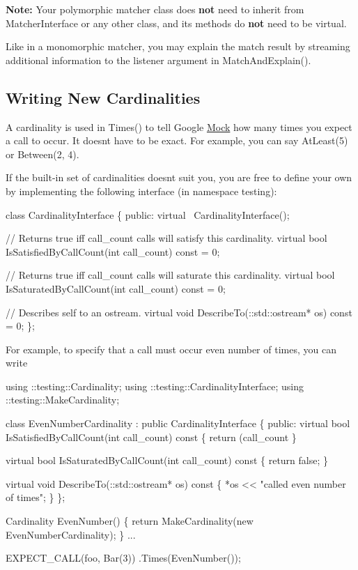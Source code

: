 {\bfseries Note\+:} Your polymorphic matcher class does {\bfseries not} need to inherit from {\ttfamily Matcher\+Interface} or any other class, and its methods do {\bfseries not} need to be virtual.

Like in a monomorphic matcher, you may explain the match result by streaming additional information to the {\ttfamily listener} argument in {\ttfamily Match\+And\+Explain()}.

\subsection*{Writing New Cardinalities}

A cardinality is used in {\ttfamily Times()} to tell Google \hyperlink{class_mock}{Mock} how many times you expect a call to occur. It doesn\textquotesingle{}t have to be exact. For example, you can say {\ttfamily At\+Least(5)} or {\ttfamily Between(2, 4)}.

If the built-\/in set of cardinalities doesn\textquotesingle{}t suit you, you are free to define your own by implementing the following interface (in namespace {\ttfamily testing})\+:


\begin{DoxyCode}
class CardinalityInterface \{
 public:
  virtual ~CardinalityInterface();

  // Returns true iff call\_count calls will satisfy this cardinality.
  virtual bool IsSatisfiedByCallCount(int call\_count) const = 0;

  // Returns true iff call\_count calls will saturate this cardinality.
  virtual bool IsSaturatedByCallCount(int call\_count) const = 0;

  // Describes self to an ostream.
  virtual void DescribeTo(::std::ostream* os) const = 0;
\};
\end{DoxyCode}


For example, to specify that a call must occur even number of times, you can write


\begin{DoxyCode}
using ::testing::Cardinality;
using ::testing::CardinalityInterface;
using ::testing::MakeCardinality;

class EvenNumberCardinality : public CardinalityInterface \{
 public:
  virtual bool IsSatisfiedByCallCount(int call\_count) const \{
    return (call\_count %
  \}

  virtual bool IsSaturatedByCallCount(int call\_count) const \{
    return false;
  \}

  virtual void DescribeTo(::std::ostream* os) const \{
    *os << "called even number of times";
  \}
\};

Cardinality EvenNumber() \{
  return MakeCardinality(new EvenNumberCardinality);
\}
...

  EXPECT\_CALL(foo, Bar(3))
      .Times(EvenNumber());
\end{DoxyCode}


